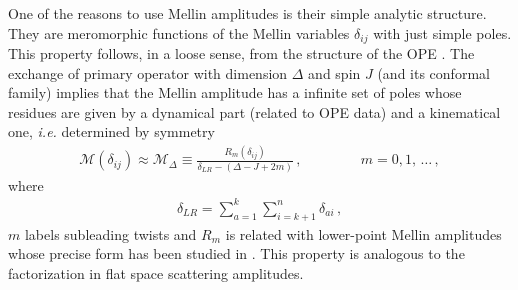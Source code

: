 One of the reasons to use Mellin amplitudes is their simple analytic structure. They are meromorphic functions of the Mellin variables $\delta_{ij}$ with just simple poles. This property follows, in a loose sense, from the structure of the OPE \cite{Goncalves:2014rfa}.  The exchange of primary operator with dimension $\Delta$ and spin $J$ (and its conformal family) implies that the Mellin amplitude has a infinite set of poles whose residues are given by a dynamical part (related to OPE data) and a kinematical one, {\em{i.e.}} determined by symmetry
\begin{align}
  \mathcal{M}(\delta_{ij}) \approx  \mathcal{M}_{\Delta} \equiv  \frac{R_{m}(\delta_{ij})}{\delta_{LR}-(\Delta-J+2m)} \,,\,
  \qquad\qquad  m=0,1,\,\dots\,,
\end{align}
where
\begin{align}
  \delta_{LR} = \sum_{a=1}^{k}\sum_{i=k+1}^{n}\delta_{ai}\,,
  \label{eq:factorizationformula}
\end{align}
$m$ labels subleading twists and $R_m$ is related with lower-point Mellin amplitudes whose precise form has been studied in \cite{Goncalves:2014rfa}. This property is analogous to the factorization in flat space scattering amplitudes.

